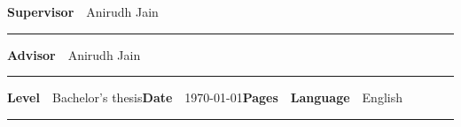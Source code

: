 \begin{spacing}{.88}
{	{\fontsize{10.5pt}{10.5pt}\bfseries\sffamily\lsstyle Supervisor}~~{\small Anirudh Jain}

	\vspace{-2.4mm}\rule{\textwidth}{.75pt}

	{\fontsize{10.5pt}{10.5pt}\bfseries\sffamily\lsstyle Advisor}~~{\small Anirudh Jain}

	\vspace{-2.4mm}\rule{\textwidth}{.75pt}

	{\fontsize{10.5pt}{10.5pt}\bfseries\sffamily\lsstyle Level}~~{\small Bachelor's thesis}\hfill{\fontsize{10.5pt}{10.5pt}\bfseries\sffamily\lsstyle Date}~~{\small \today}\hfill{\fontsize{10.5pt}{10.5pt}\bfseries\sffamily\lsstyle Pages}~~{\small \pageref{LastPage}}\hfill{\fontsize{10.5pt}{10.5pt}\bfseries\sffamily\lsstyle Language}~~{\small English}

	\vspace{-2.4mm}\rule{\textwidth}{.75pt}

	\vspace{6mm}

	} %
\end{spacing}
